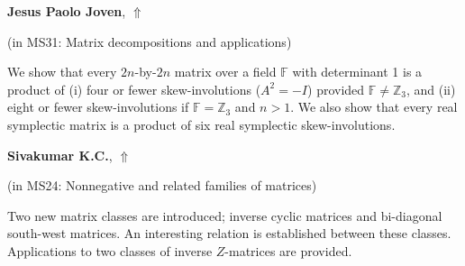 \documentclass[ILAS2025-program.tex]{subfiles}
\begin{document}
\hypertarget{down0308}{}\begin{ilasabstract}
    
\textbf{Jesus Paolo Joven},  \hfill \hyperlink{up0308}{$\Uparrow$}
    
    
(in {\color{mstitle}MS31: Matrix decompositions and applications})
        
\mtskip
    We show that every $2n$-by-$2n$ matrix over a field $\mathbb{F}$ with determinant 1 is a product of (i) four or fewer skew-involutions ($A^2 = -I$) provided $\mathbb{F} \neq \mathbb{Z}_3$, and (ii) eight or fewer skew-involutions if $\mathbb{F} = \mathbb{Z}_3$ and $n > 1$. We also show that every real symplectic matrix is a product of six real symplectic skew-involutions. 

\end{ilasabstract}
    

\hypertarget{down0353}{}\begin{ilasabstract}
    
\textbf{Sivakumar K.C.},  \hfill \hyperlink{up0353}{$\Uparrow$}
    
    
(in {\color{mstitle}MS24: Nonnegative and related families of matrices})
        
\mtskip
    Two new matrix classes are introduced; inverse cyclic matrices and bi-diagonal south-west matrices. An interesting relation is established between these classes. Applications to two classes of inverse $Z$-matrices are provided.

\end{ilasabstract}
    
\end{document}
